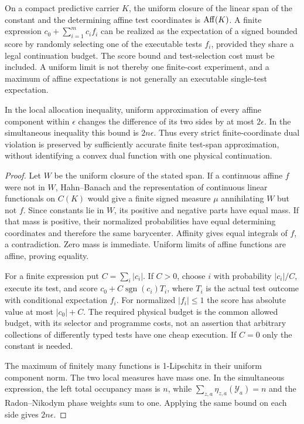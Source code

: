 \begin{lemma}\label{lem:operational_tests}
On a compact predictive carrier $K$, the uniform closure of the linear span of the constant and the determining affine test coordinates is $\operatorname{Aff}(K)$. A finite expression $c_0+\sum_{i=1}^m c_i f_i$ can be realized as the expectation of a signed bounded score by randomly selecting one of the executable tests $f_i$, provided they share a legal continuation budget. The score bound and test-selection cost must be included. A uniform limit is not thereby one finite-cost experiment, and a maximum of affine expectations is not generally an executable single-test expectation.

In the local allocation inequality, uniform approximation of every affine component within $\epsilon$ changes the difference of its two sides by at most $2\epsilon$. In the simultaneous inequality this bound is $2n\epsilon$. Thus every strict finite-coordinate dual violation is preserved by sufficiently accurate finite test-span approximation, without identifying a convex dual function with one physical continuation.
\end{lemma}
\begin{proof}
Let $W$ be the uniform closure of the stated span. If a continuous affine $f$ were not in $W$, Hahn--Banach and the representation of continuous linear functionals on $C(K)$ would give a finite signed measure $\mu$ annihilating $W$ but not $f$. Since constants lie in $W$, its positive and negative parts have equal mass. If that mass is positive, their normalized probabilities have equal determining coordinates and therefore the same barycenter. Affinity gives equal integrals of $f$, a contradiction. Zero mass is immediate. Uniform limits of affine functions are affine, proving equality.

For a finite expression put $C=\sum_i|c_i|$. If $C>0$, choose $i$ with probability $|c_i|/C$, execute its test, and score $c_0+C\operatorname{sgn}(c_i)T_i$, where $T_i$ is the actual test outcome with conditional expectation $f_i$. For normalized $|f_i|\le1$ the score has absolute value at most $|c_0|+C$. The required physical budget is the common allowed budget, with its selector and programme costs, not an assertion that arbitrary collections of differently typed tests have one cheap execution. If $C=0$ only the constant is needed.

The maximum of finitely many functions is 1-Lipschitz in their uniform component norm. The two local measures have mass one. In the simultaneous expression, the left total occupancy mass is $n$, while $\sum_{z,a}\eta_{z,a}(\mathcal Y_a)=n$ and the Radon--Nikodym phase weights sum to one. Applying the same bound on each side gives $2n\epsilon$.
\end{proof}
